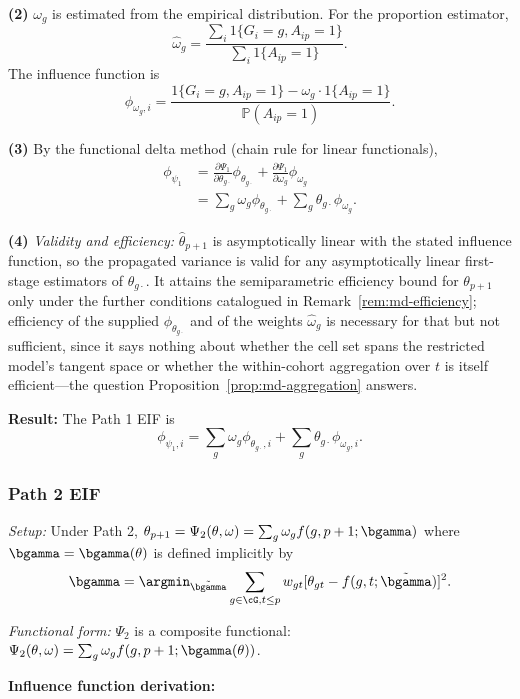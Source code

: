 \documentclass{article}
\renewcommand{\P}{\mathbb{P}}
\begin{document}
\textbf{(2)} $\omega_g$ is estimated from the empirical distribution. For the proportion estimator,
\[
\widehat{\omega}_g = \frac{\sum_i 1\{G_i = g, A_{ip} = 1\}}{\sum_i 1\{A_{ip} = 1\}}.
\]
The influence function is
\[
\phi_{\omega_g,i} = \frac{1\{G_i = g, A_{ip} = 1\} - \omega_g \cdot 1\{A_{ip} = 1\}}{\P(A_{ip} = 1)}.
\]

\textbf{(3)} By the functional delta method (chain rule for linear functionals),
\begin{align*}
\phi_{\psi_1} &= \frac{\partial \Psi_1}{\partial \theta_{g\cdot}} \phi_{\theta_{g\cdot}} + \frac{\partial \Psi_1}{\partial \omega_g} \phi_{\omega_g} \\
&= \sum_{g} \omega_g \phi_{\theta_{g\cdot}} + \sum_g \theta_{g\cdot} \phi_{\omega_g}.
\end{align*}

\textbf{(4)} \textit{Validity and efficiency:} $\widehat{\theta}_{p+1}$ is asymptotically linear with the stated influence function, so the propagated variance is valid for any asymptotically linear first-stage estimators of $\theta_{g\cdot}$. It attains the semiparametric efficiency bound for $\theta_{p+1}$ only under the further conditions catalogued in Remark~\ref{rem:md-efficiency}; efficiency of the supplied $\phi_{\theta_{g\cdot}}$ and of the weights $\widehat{\omega}_g$ is necessary for that but not sufficient, since it says nothing about whether the cell set spans the restricted model's tangent space or whether the within-cohort aggregation over $t$ is itself efficient---the question Proposition~\ref{prop:md-aggregation} answers.

\textbf{Result:} The Path 1 EIF is
\[
\phi_{\psi_1,i} = \sum_{g} \omega_g \phi_{\theta_{g\cdot},i} + \sum_g \theta_{g\cdot} \phi_{\omega_g,i}.
\]

\subsubsection{Path 2 EIF}\label{app:eif2}

\textit{Setup:} Under Path 2, $\theta_{p+1} = \Psi_2(\theta, \omega) = \sum_g \omega_g f(g,p+1;\bgamma)$ where $\bgamma = \bgamma(\theta)$ is defined implicitly by
\[
\bgamma = \argmin_{\tilde{\bgamma}} \sum_{g \in \cG, t \leq p} w_{gt} [\theta_{gt} - f(g,t;\tilde{\bgamma})]^2.
\]

\textit{Functional form:} $\Psi_2$ is a composite functional: $\Psi_2(\theta,\omega) = \sum_g \omega_g f(g,p+1; \bgamma(\theta))$.

\textbf{Influence function derivation:}
\end{document}
